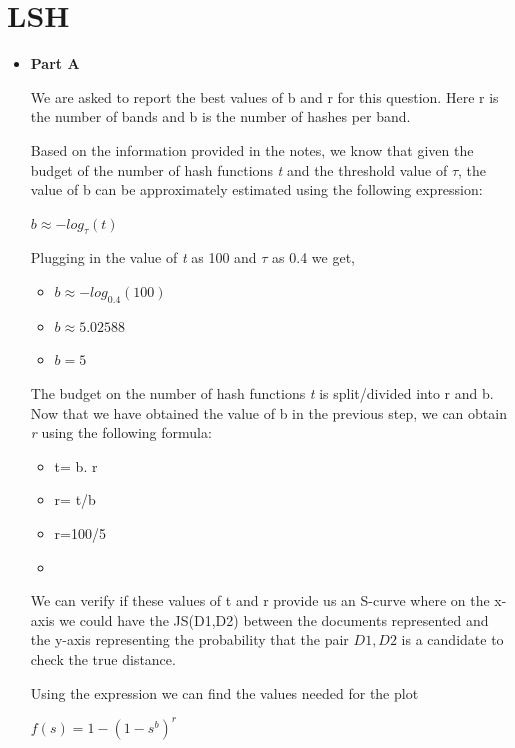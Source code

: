 \documentclass[11pt]{article}
\begin{document}
\pagebreak

\section{LSH}

\begin{itemize}
	\item[] \textbf{Part A}
	
	We are asked to report the best values of b and r for this question. Here r is the number of bands and b is the number of hashes per band.
	
	Based on the information provided in the notes, we know that given the budget of the number of hash functions \emph t and the threshold value of $\tau$, the value of b can be approximately estimated using the following expression:
	
	\begin{center}
		$b \approx - log_{\tau}(t)$
	\end{center}
	
	Plugging in the value of \emph t as 100 and $\tau$ as 0.4 we get,
		\begin{itemize}
		\item[] $b \approx - log_{0.4}(100)$
		\item[]  $b \approx 5.02588$
		\item[] $\boxed{ b= 5}$
		\end{itemize}
		
	The budget on the number of hash functions \emph t is split/divided into r and b. Now that we have obtained the value of b in the previous step, we can obtain \emph r using the following formula:
	\begin{itemize}
		\item[] t= b. r
		\item[] r= t/b
		\item[] r=100/5
		\item[] 
	\end{itemize}	
	
	We can verify if these values of t and r provide us an S-curve where on the x-axis we could have the JS(D1,D2) between the documents represented and the y-axis representing the probability that the pair $D1,D2$ is a candidate to check the true distance.
	
	Using the expression we can find the values needed for the plot \begin{center}
		$f(s)=1-(1-s^{b})^{r}$
	\end{center}
	

\end{itemize}
\end{document}
